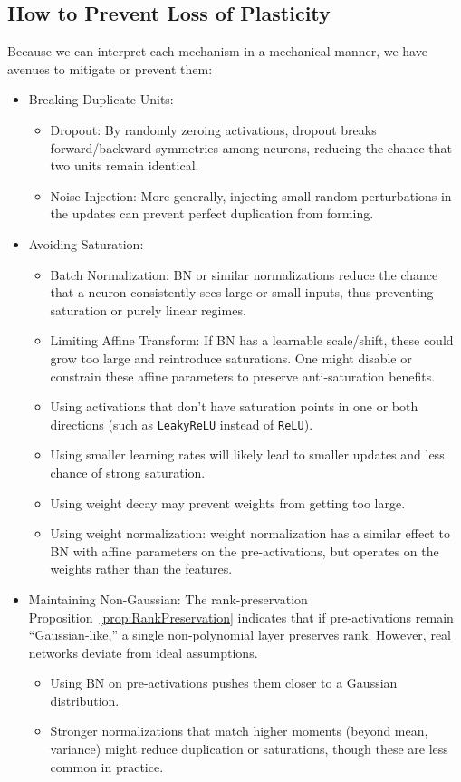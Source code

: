 \documentclass[11pt]{article}
\begin{document}
\subsection{How to Prevent Loss of Plasticity}
Because we can interpret each mechanism in a mechanical manner, we have avenues to mitigate or prevent them:
\begin{itemize}
    \item Breaking Duplicate Units:
    \begin{itemize}
        \item Dropout: By randomly zeroing activations, dropout breaks forward/backward symmetries among neurons, reducing the chance that two units remain identical.
        \item Noise Injection: More generally, injecting small random perturbations in the updates can prevent perfect duplication from forming.
    \end{itemize}
    \item Avoiding Saturation:
    \begin{itemize}
        \item Batch Normalization: BN or similar normalizations reduce the chance that a neuron consistently sees large or small inputs, thus preventing saturation or purely linear regimes.
        \item Limiting Affine Transform: If BN has a learnable scale/shift, these could grow too large and reintroduce saturations. One might disable or constrain these affine parameters to preserve anti-saturation benefits.
        \item Using activations that don't have saturation points in one or both directions (such as \texttt{LeakyReLU} instead of \texttt{ReLU}).
        \item Using smaller learning rates will likely lead to smaller updates and less chance of strong saturation.
        \item Using weight decay may prevent weights from getting too large. 
        \item Using weight normalization: weight normalization has a similar effect to BN with affine parameters on the pre-activations, but operates on the weights rather than the features. 
    \end{itemize}
    \item Maintaining Non-Gaussian:  
    The rank-preservation Proposition~\ref{prop:RankPreservation} indicates that if pre-activations remain ``Gaussian-like,'' a single non-polynomial layer preserves rank. However, real networks deviate from ideal assumptions.
    \begin{itemize}
        \item Using BN on pre-activations pushes them closer to a Gaussian distribution.
        \item Stronger normalizations that match higher moments (beyond mean, variance) might reduce duplication or saturations, though these are less common in practice.
    \end{itemize}
\end{itemize}
\end{document}
